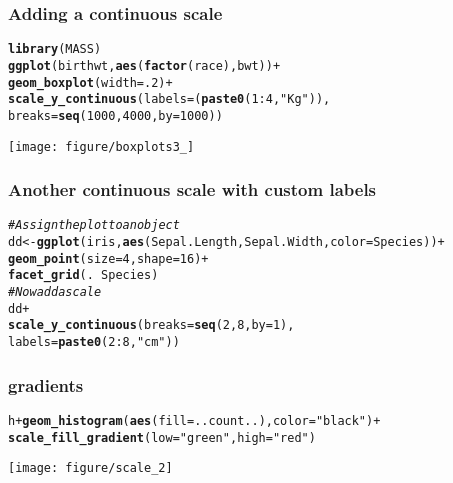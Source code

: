 \documentclass{beamer}\usepackage[]{graphicx}\usepackage[]{color}
\makeatletter
\newcommand{\hlstr}[1]{\textcolor[rgb]{0.192,0.494,0.8}{#1}}%
\newcommand{\hlcom}[1]{\textcolor[rgb]{0.678,0.584,0.686}{\textit{#1}}}%
\newcommand{\hlkwd}[1]{\textcolor[rgb]{0.737,0.353,0.396}{\textbf{#1}}}%
\newenvironment{kframe}{%
 \def\at@end@of@kframe{}%
 \ifinner\ifhmode%
  \def\at@end@of@kframe{\end{minipage}}%
  \begin{minipage}{\columnwidth}%
 \fi\fi%
 \def\FrameCommand##1{\hskip\@totalleftmargin \hskip-\fboxsep
 \colorbox{shadecolor}{##1}\hskip-\fboxsep
     \hskip-\linewidth \hskip-\@totalleftmargin \hskip\columnwidth}%
 \MakeFramed {\advance\hsize-\width
   \@totalleftmargin\z@ \linewidth\hsize
   \@setminipage}}%
 {\par\unskip\endMakeFramed%
 \at@end@of@kframe}
\newenvironment{knitrout}{}{} %
\makeatother
\begin{document}
\begin{frame}[fragile]
\frametitle{Adding a continuous scale}
\begin{knitrout}\footnotesize
{}\color{fgcolor}\begin{kframe}
\begin{alltt}
\hlkwd{library}(MASS)
\hlkwd{ggplot}(birthwt, \hlkwd{aes}(\hlkwd{factor}(race), bwt)) +
\hlkwd{geom_boxplot}(width = .2) +
\hlkwd{scale_y_continuous}(labels = (\hlkwd{paste0}(1:4, \hlstr{" Kg"})),
breaks = \hlkwd{seq}(1000, 4000, by = 1000))
\end{alltt}
\end{kframe}

{\centering \texttt{[image: figure/boxplots3\_]} 

}



\end{knitrout}

\end{frame}


\begin{frame}[fragile]
\frametitle{Another continuous scale with custom labels}
\begin{knitrout}\footnotesize
{}\color{fgcolor}\begin{kframe}
\begin{alltt}
\hlcom{# Assign the plot to an object}
dd <- \hlkwd{ggplot}(iris, \hlkwd{aes}(Sepal.Length, Sepal.Width, color = Species)) +
\hlkwd{geom_point}(size = 4, shape = 16) +
\hlkwd{facet_grid}(. ~Species)
\hlcom{# Now add a scale}
dd +
\hlkwd{scale_y_continuous}(breaks = \hlkwd{seq}(2, 8, by = 1),
labels = \hlkwd{paste0}(2:8, \hlstr{" cm"}))
\end{alltt}
\end{kframe}
\end{knitrout}

\end{frame}


\begin{frame}[fragile]
\frametitle{gradients}
\begin{knitrout}\footnotesize
{}\color{fgcolor}\begin{kframe}
\begin{alltt}
h + \hlkwd{geom_histogram}( \hlkwd{aes}(fill = ..count..), color=\hlstr{"black"}) +
\hlkwd{scale_fill_gradient}(low=\hlstr{"green"}, high=\hlstr{"red"})
\end{alltt}
\end{kframe}

{\centering \texttt{[image: figure/scale\_2]} 

}



\end{knitrout}

\end{frame}
\end{document}
